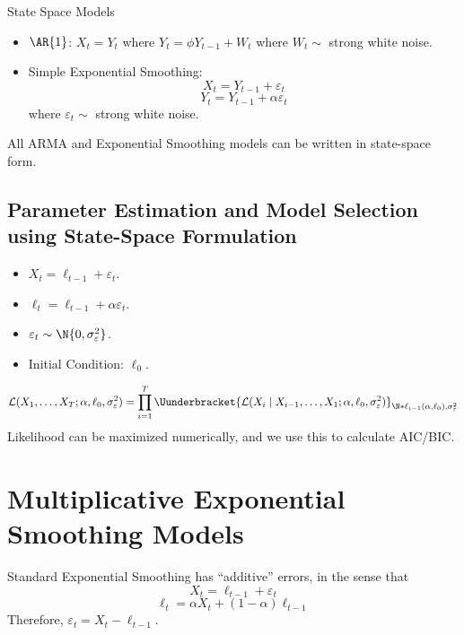 \begin{Example}{State Space Models}{}
      \begin{itemize}
            \item $ \AR{1} $: $ X_t=Y_t $ where $ Y_t=\phi Y_{t-1}+W_t $
                  where $ W_t \sim  $ strong white noise.
            \item Simple Exponential Smoothing:
                  \[ X_t=Y_{t-1}+\varepsilon_t \]
                  \[ Y_t=Y_{t-1}+\alpha \varepsilon_t \]
                  where $ \varepsilon_t \sim  $ strong white noise.
      \end{itemize}
      All ARMA and Exponential Smoothing models can be written in state-space form.
\end{Example}
\subsection*{Parameter Estimation and Model Selection using State-Space Formulation}
\begin{itemize}
      \item $ X_t=\ell_{t-1}+\varepsilon_t $.
      \item $ \ell_t=\ell_{t-1}+\alpha\varepsilon_t $.
      \item $ \varepsilon_t \sim \N{0,\sigma_\varepsilon^2} $.
      \item Initial Condition: $ \ell_0 $.
\end{itemize}
\[ \mathcal{L}(X_1,\ldots,X_T;\alpha,\ell_0,\sigma_\varepsilon^2)=
      \prod_{i=1}^T \Uunderbracket{\mathcal{L}(X_i\mid X_{i-1},\ldots,X_1;\alpha,\ell_0,\sigma_\varepsilon^2)}_{
      \N*{\ell_{i-1}(\alpha,\ell_0),\sigma_\varepsilon^2}
      } \]
Likelihood can be maximized numerically, and we use this to calculate AIC/BIC\@.

\section{Multiplicative Exponential Smoothing Models}
Standard Exponential Smoothing has ``additive'' errors, in the sense that
\[ X_t=\ell_{t-1}+\varepsilon_t \]
\[ \ell_t=\alpha X_t+(1-\alpha)\ell_{t-1} \]
Therefore, $ \varepsilon_t=X_t-\ell_{t-1} $.

